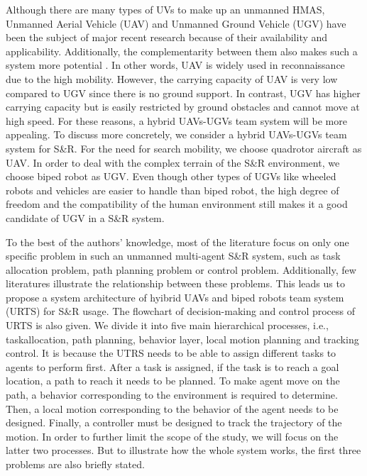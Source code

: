\documentclass{ieeeaccess}
\begin{document}
Although there are many types of UVs to make up an unmanned HMAS, Unmanned Aerial Vehicle (UAV) and Unmanned Ground Vehicle (UGV) have been the subject of major recent research because of their availability and applicability. Additionally, the complementarity between them also makes such a system more potential \cite{arbanas2018decentralized}. In other words, UAV is widely used in reconnaissance due to the high mobility. However, the carrying capacity of UAV is very low compared to UGV since there is no ground support. In contrast, UGV has higher carrying capacity but is easily restricted by ground obstacles and cannot move at high speed. For these reasons, a hybrid UAVs-UGVs team system will be more appealing. To discuss more concretely, we consider a hybrid UAVs-UGVs team system for S\&R. For the need for search mobility, we choose quadrotor aircraft as UAV. In order to deal with the complex terrain of the S\&R environment, we choose biped robot as UGV. Even though other types of UGVs like wheeled robots and vehicles are easier to handle than biped robot, the high degree of freedom and the compatibility of the human environment still makes it a good candidate of UGV in a S\&R system.

To the best of the authors' knowledge, most of the literature focus on only one specific problem in such an unmanned multi-agent S\&R system, such as task allocation problem, path planning problem or control problem. Additionally, few literatures illustrate the relationship between these problems. This leads us to propose a system architecture of hyibrid UAVs and biped robots team system (URTS) for S\&R usage. The flowchart of decision-making and control process of URTS is also given. We divide it into five main hierarchical processes, i.e., taskallocation, path planning, behavior layer, local motion planning and tracking control. It is because the UTRS needs to be able to assign different tasks to agents to perform first. After a task is assigned, if the task is to reach a goal location, a path to reach it needs to be planned. To make agent move on the path, a behavior corresponding to the environment is required to determine. Then, a local motion corresponding to the behavior of the agent needs to be designed. Finally, a controller must be designed to track the trajectory of the motion. In order to further limit the scope of the study, we will focus on the latter two processes. But to illustrate how the whole system works, the first three problems are also briefly stated.
\end{document}
